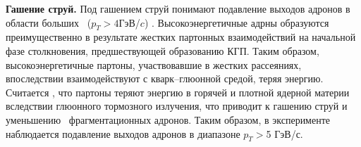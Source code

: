 \textbf{Гашение струй.} 
Под гашением струй понимают подавление выходов адронов в области больших \pt \ ($p_T>4$ГэВ/$c$) \cite{jet_quenching}. Высокоэнергетичные адрны образуются преимущественно в результате жестких партонных взаимодействий на начальной фазе столкновения, предшествующей образованию КГП. Таким образом, высокоэнергетичные партоны, участвовавшие в жестких рассеяниях, впоследствии взаимодействуют с кварк–глюонной средой, теряя энергию. Считается \cite{jet_quenching,InitialEnergyLoss}, что партоны теряют энергию в горячей и плотной ядерной материи вследствии глюонного тормозного излучения, что приводит к гашению струй и уменьшению \pt \ фрагментационных адронов.  Таким образом, в эксперименте наблюдается подавление выходов адронов в диапазоне $p_T > $5 ГэВ/с. 



